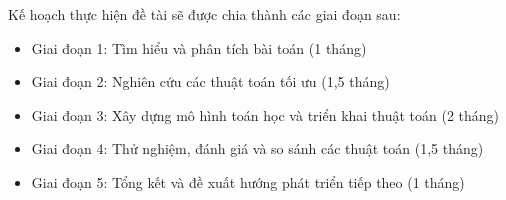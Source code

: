 Kế hoạch thực hiện đề tài sẽ được chia thành các giai đoạn sau:
\begin{itemize} 
    \item Giai đoạn 1: Tìm hiểu và phân tích bài toán (1 tháng) 
    
    \item Giai đoạn 2: Nghiên cứu các thuật toán tối ưu (1,5 tháng) 
    
    \item Giai đoạn 3: Xây dựng mô hình toán học và triển khai thuật toán (2 tháng) 
    
    \item Giai đoạn 4: Thử nghiệm, đánh giá và so sánh các thuật toán (1,5 tháng) 
    
    \item Giai đoạn 5: Tổng kết và đề xuất hướng phát triển tiếp theo (1 tháng) 
\end{itemize}
